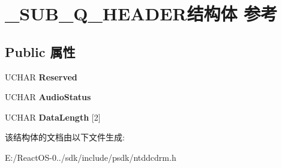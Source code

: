 \hypertarget{struct___s_u_b___q___h_e_a_d_e_r}{}\section{\+\_\+\+S\+U\+B\+\_\+\+Q\+\_\+\+H\+E\+A\+D\+E\+R结构体 参考}
\label{struct___s_u_b___q___h_e_a_d_e_r}
\subsection*{Public 属性}
\begin{DoxyCompactItemize}
\item 
\mbox{\label{struct___s_u_b___q___h_e_a_d_e_r_ac7d079bb4d4fd7685de26f614640ca94}} 
U\+C\+H\+AR {\bfseries Reserved}
\item 
\mbox{\label{struct___s_u_b___q___h_e_a_d_e_r_a05ee2b286a3153f60a307ee21c327555}} 
U\+C\+H\+AR {\bfseries Audio\+Status}
\item 
\mbox{\label{struct___s_u_b___q___h_e_a_d_e_r_ab0bbb8fd37dd58f0bab87f7e5cdc47c8}} 
U\+C\+H\+AR {\bfseries Data\+Length} \mbox{[}2\mbox{]}
\end{DoxyCompactItemize}


该结构体的文档由以下文件生成\+:\begin{DoxyCompactItemize}
\item 
E\+:/\+React\+O\+S-\/0../sdk/include/psdk/ntddcdrm.\+h\end{DoxyCompactItemize}
